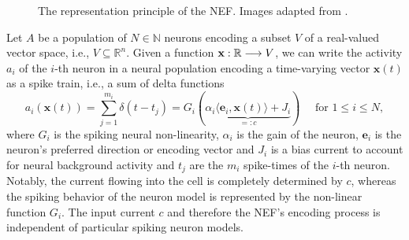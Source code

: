 \begin{figure}[t!]
{	}
	\caption{The representation principle of the \ac{NEF}. 
    Images adapted from \textcite{Bekolay2014}.}
    \label{fig:nef_representation}
\end{figure}
Let $A$ be a population of $N \in \mathbb{N}$ neurons encoding a subset $V$ of a real-valued vector space, i.e., $V\subseteq \mathbb{R}^{n}$.
Given a function $\mathbf{x}: \mathbb{R} \longrightarrow V$, we can write the activity $a_{i}$ of the $i$-th neuron in a neural population encoding a time-varying vector $\mathbf{x}(t)$ as a spike train, i.e., a sum of delta functions
\begin{equation}
a_{i}\left(\mathbf{x}(t)\right) = \sum_{j=1}^{m_{i}} \delta(t - t_{j}) = G_{i}(\underbrace{\alpha_{i}\langle\mathbf{e}_{i},\mathbf{x}(t)\rangle + J_{i}}_{=:c}) \quad \textrm{ for } 1 \leq i \leq N,
\label{eq:nef_encoding}
\end{equation}
where $G_{i}$ is the spiking neural non-linearity, $\alpha_{i}$ is the gain of the neuron, $\mathbf{e}_{i}$ is the neuron's preferred direction or encoding vector and $J_{i}$ is a bias current to account for neural background activity and $t_{j}$ are the $m_{i}$ spike-times of the $i$-th neuron.
Notably, the current flowing into the cell is completely determined by $c$, whereas the spiking behavior of the neuron model is represented by the non-linear function $G_{i}$.
The input current $c$ and therefore the \ac{NEF}'s encoding process is independent of particular spiking neuron models.

